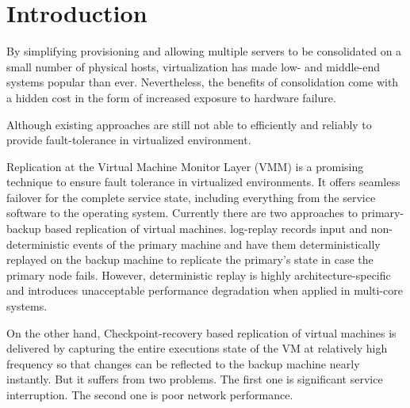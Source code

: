 \section{Introduction} \label{sec:intro}

By simplifying provisioning and allowing multiple servers to be consolidated on a 
small number of physical hosts, virtualization has made low- and middle-end systems 
popular than ever. Nevertheless, the benefits of consolidation come with a hidden cost 
in the form of increased exposure to hardware failure. 

Although existing approaches are still not able to efficiently and reliably to provide fault-tolerance 
in virtualized environment.



Replication at the Virtual Machine Monitor Layer (VMM) is a promising technique to 
ensure fault tolerance in virtualized environments. It offers seamless failover for the 
complete service state, including everything from the service software to the operating system. 
Currently there are two approaches to primary-backup based replication of virtual machines.
log-replay records input and non-deterministic events of the primary machine 
and have them deterministically replayed on the backup machine to replicate the primary's state 
in case the primary node fails. However, deterministic replay is highly architecture-specific and 
introduces unacceptable performance degradation when applied in multi-core systems.

On the other hand, Checkpoint-recovery based replication of virtual machines is delivered by 
capturing the entire executions state of the VM at relatively high frequency so that changes can 
be reflected to the backup machine nearly instantly. But it suffers from two problems. The first one 
is significant service interruption. The second one is poor network performance.

